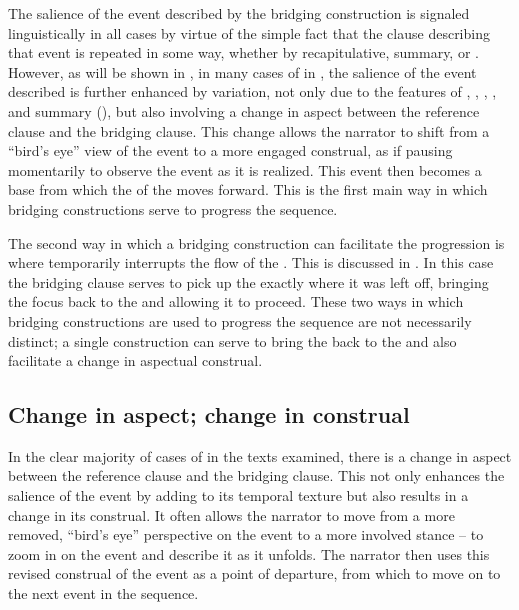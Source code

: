 \documentclass[output=paper]{LSP/langsci}
\begin{document}
The salience of the event described by the bridging construction is signaled linguistically in all cases by virtue of the simple fact that the clause describing that event is repeated in some way, whether by recapitulative, summary, or . However, as will be shown in  , in many cases of  in , the salience of the event described is further enhanced by variation, not only due to the features of , , , , and summary (), but also involving a change in aspect between the reference clause and the bridging clause. This change allows the narrator to shift from a ``bird’s eye'' view of the event to a more engaged construal, as if pausing momentarily to observe the event as it is realized. This event then becomes a base from which the  of the  moves forward. This  is the first main way in which bridging constructions serve to progress the  sequence.

The second way in which a bridging construction can facilitate the  progression is where  temporarily interrupts the flow of the . This is discussed in . In this case the bridging clause serves to pick up the  exactly where it was left off, bringing the focus back to the  and allowing it to proceed. These two ways in which bridging constructions are used to progress the  sequence are not necessarily distinct; a single construction can serve to bring the  back to the  and also facilitate a change in aspectual construal.


\subsection{Change in aspect; change in construal}
\label{JaChange}
In the clear majority of cases of  in the  texts examined, there is a change in aspect between the reference clause and the bridging clause. This not only enhances the salience of the event by adding to its temporal texture but also results in a change in its construal. It often allows the narrator to move from a more removed, ``bird’s eye'' perspective on the event to a more involved stance -- to zoom in on the event and describe it as it unfolds. The narrator then uses this revised construal of the event as a point of departure, from which to move on to the next event in the  sequence. 
\end{document}
